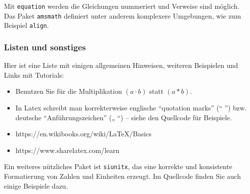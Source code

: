 Mit \texttt{equation} werden die Gleichungen nummeriert und Verweise sind möglich. Das Paket \texttt{amsmath} definiert unter anderem komplexere Umgebungen, wie zum Beispiel \texttt{align}. 


\subsubsection{Listen und sonstiges}
Hier ist eine Liste mit einigen allgemeinen Hinweisen, weiteren Beispielen und Links mit Tutorials:
\begin{itemize}
	\item Benutzen Sie für die Multiplikation $(a \cdot b)$ statt $(a * b)$. 
	\item In Latex schreibt man korrekterweise englische ``quotation marks'' (“ ”) bzw. deutsche "`Anführungszeichen"' („ “) -- siehe den Quellcode für Beispiele. 
	\item https://en.wikibooks.org/wiki/LaTeX/Basics
	\item https://www.sharelatex.com/learn
\end{itemize}


Ein weiteres nützliches Paket ist \texttt{siunitx}, das eine korrekte und konsistente Formatierung von Zahlen und Einheiten erzeugt. Im Quellcode finden Sie auch einige Beispiele dazu.



\vspace{1cm}
